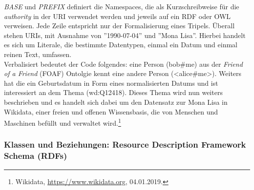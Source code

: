 \documentclass[12pt,a4paper]{article}
\begin{document}
\textit{BASE} und \textit{PREFIX} definiert die Namespaces, die als Kurzschreibweise für die \textit{authority} in der URI verwendet werden und jeweils auf ein RDF oder OWL verweisen. Jede Zeile entspricht nur der Formalisierung eines Tripels. Überall stehen URIs, mit Ausnahme von ''1990-07-04'' und ''Mona Lisa''. Hierbei handelt es sich um Literale, die bestimmte Datentypen, einmal ein Datum und einmal reinen Text, umfassen. 
\\
Verbalisiert bedeutet der Code folgendes: eine Person (bob\#me) aus der \textit{Friend of a Friend} (FOAF) Ontolgie kennt eine andere Person (<alice\#me>). Weiters hat die ein Geburtsdatum in Form eines normalisierten Datums und ist interessiert an dem Thema (wd:Q12418). Dieses Thema wird nun weiters beschrieben und es handelt sich dabei um den Datensatz zur Mona Lisa in Wikidata, einer freien und offenen Wissensbasis, die von Menschen und Maschinen befüllt und verwaltet wird.\footnote{Wikidata, \url{https://www.wikidata.org}, 04.01.2019.}
\subsubsection{Klassen und Beziehungen: Resource Description Framework Schema (RDFs)}
\end{document}

